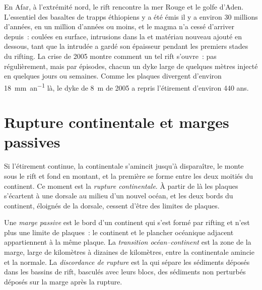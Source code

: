 En Afar, à l'extrémité nord, le rift rencontre la mer Rouge et le golfe d'Aden.
L'essentiel des basaltes de trapps éthiopiens y a été émis il y a environ 30 millions d'années,
en un million d'années ou moins, et le magma n'a cessé d'arriver depuis~: coulées
en surface, intrusions dans la  et matériau nouveau ajouté en dessous, tant
que la  intrudée a gardé son épaisseur pendant les premiers stades
du rifting. La crise de 2005 montre comment un tel rift s'ouvre~: pas régulièrement, mais
par épisodes, chacun un dyke large de quelques mètres injecté en quelques jours ou semaines. Comme les
plaques divergent d'environ \qty{18}{mm.an^{-1}} là, le dyke de \qty{8}{m} de
2005 a repris l'étirement d'environ 440 ans.

\section{Rupture continentale et marges passives}

Si l'étirement continue, la  continentale s'amincit jusqu'à disparaître, le 
monte sous le rift et fond en montant, et la première 
se forme entre les deux moitiés du continent. Ce moment est la
\emph{rupture continentale}. À partir de là les plaques s'écartent à une dorsale au milieu
d'un nouvel océan, et les deux bords du continent, éloignés de la dorsale,
cessent d'être des limites de plaques.

\begin{definition}\label{def:b1:rifts-ridges-margins:passive-margin}
Une \emph{marge passive} est le bord d'un continent qui
s'est formé par rifting et n'est plus une limite de plaques~: le continent et le
plancher océanique adjacent appartiennent à la même plaque. La
\emph{transition océan--continent} est la
zone de la marge, large de kilomètres à dizaines de kilomètres, entre la 
continentale amincie et la  normale. La \emph{discordance de
rupture} est la  qui sépare
les sédiments déposés dans les bassins de rift, basculés avec leurs blocs, des
sédiments non perturbés déposés sur la marge après la rupture.
\end{definition}

